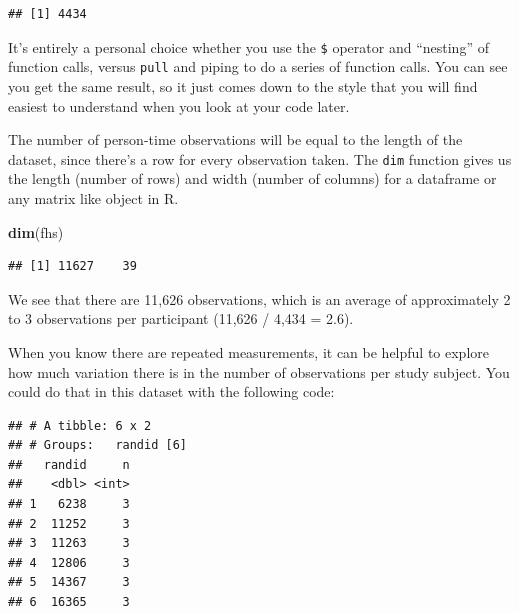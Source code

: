 \documentclass[
]{book}
\newenvironment{Shaded}{\begin{snugshade}}{\end{snugshade}}
\newcommand{\CommentTok}[1]{\textcolor[rgb]{0.56,0.35,0.01}{\textit{#1}}}
\newcommand{\KeywordTok}[1]{\textcolor[rgb]{0.13,0.29,0.53}{\textbf{#1}}}
\newcommand{\NormalTok}[1]{#1}
\newcommand{\OperatorTok}[1]{\textcolor[rgb]{0.81,0.36,0.00}{\textbf{#1}}}
\newcommand{\StringTok}[1]{\textcolor[rgb]{0.31,0.60,0.02}{#1}}
\begin{document}
\begin{verbatim}
## [1] 4434
\end{verbatim}

It's entirely a personal choice whether you use the \texttt{\$} operator and ``nesting''
of function calls, versus \texttt{pull} and piping to do a series of function calls.
You can see you get the same result, so it just comes down to the style that
you will find easiest to understand when you look at your code later.

The number of person-time observations will be equal to the length of the dataset, since there's a row for every observation taken.
The \texttt{dim} function gives us the length (number of rows) and width (number of columns) for a dataframe or any matrix like object in R.

\begin{Shaded}
\begin{Highlighting}[]
\KeywordTok{dim}\NormalTok{(fhs)}
\end{Highlighting}
\end{Shaded}

\begin{verbatim}
## [1] 11627    39
\end{verbatim}

We see that there are 11,626 observations, which is an average of approximately 2 to 3 observations per participant (11,626 / 4,434 = 2.6).

When you know there are repeated measurements, it can be helpful to explore
how much variation there is in the number of observations per study subject.
You could do that in this dataset with the following code:

\begin{Shaded}
\end{Shaded}

\begin{verbatim}
## # A tibble: 6 x 2
## # Groups:   randid [6]
##   randid     n
##    <dbl> <int>
## 1   6238     3
## 2  11252     3
## 3  11263     3
## 4  12806     3
## 5  14367     3
## 6  16365     3
\end{verbatim}
\end{document}
